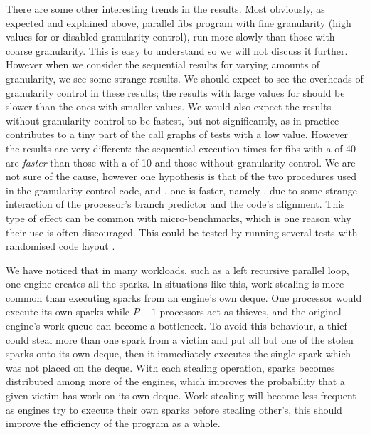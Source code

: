 There are some other interesting trends in the results.
Most obviously,
as expected and explained above,
parallel fibs program with fine granularity
(high values for \Depth or disabled granularity control),
run more slowly than those with coarse granularity.
This is easy to understand so we will not discuss it further.
However
when we consider the sequential results for varying amounts of granularity,
we see some strange results.
We should expect to see the overheads of granularity control in these
results;
the results with large values for \Depth should be slower than the ones with
smaller values.
We would also expect the results without granularity control to be fastest,
but not significantly,
as in practice \fibsgc contributes to a tiny part of the call graphs of tests
with a low \Depth value.
However the results are very different:
the sequential execution times for fibs with a \Depth of 40
are \emph{faster} than those with a \Depth of 10
and those without granularity control.
We are not sure of the cause,
however one hypothesis is that of the two procedures used in the granularity control
code,
\fibsseq and \fibsgc,
one is faster, namely \fibsgc, due to
some strange interaction of the processor's branch predictor and the code's
alignment.
This type of effect can be common with micro-benchmarks,
which is one reason why their use is often discouraged.
This could be tested by running several tests with randomised code layout
\citep{curtsinger:2012:stabilizer}.

We have noticed that in many workloads,
such as a left recursive parallel loop,
one engine creates all the sparks.
In situations like this,
work stealing is more common than executing sparks from an engine's own
deque.
One processor would execute its own sparks while $P - 1$ processors act as
thieves,
and the original engine's work queue can become a bottleneck.
To avoid this behaviour,
a thief could steal more than one spark from a victim and put all but one of
the stolen sparks 
onto its own deque, then it immediately executes the single spark which was
not placed on the deque.
With each stealing operation, 
sparks becomes distributed among more of the engines,
which improves the probability that a given victim has work on its own deque.
Work stealing will become less frequent as engines try to execute their own
sparks before stealing other's,
this should improve the efficiency of the program as a whole.

